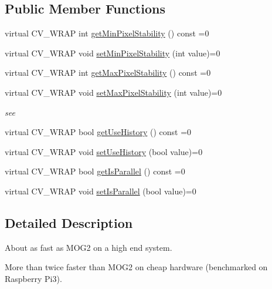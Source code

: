 \subsection*{Public Member Functions}
\begin{DoxyCompactItemize}
\item 
virtual C\+V\+\_\+\+W\+R\+AP int \hyperlink{classcv_1_1bgsubcnt_1_1BackgroundSubtractorCNT_ae989dd01f33c289a21b995ee9c69c600}{get\+Min\+Pixel\+Stability} () const =0
\item 
virtual C\+V\+\_\+\+W\+R\+AP void \hyperlink{classcv_1_1bgsubcnt_1_1BackgroundSubtractorCNT_a7fe9be675d4c1995123a60d56db75422}{set\+Min\+Pixel\+Stability} (int value)=0
\item 
virtual C\+V\+\_\+\+W\+R\+AP int \hyperlink{classcv_1_1bgsubcnt_1_1BackgroundSubtractorCNT_ac45a2faa6b753624cbbff9d341cdd3db}{get\+Max\+Pixel\+Stability} () const =0
\item 
virtual C\+V\+\_\+\+W\+R\+AP void \hyperlink{classcv_1_1bgsubcnt_1_1BackgroundSubtractorCNT_a3414551506bf27dda254dd245bfa8e03}{set\+Max\+Pixel\+Stability} (int value)=0
\begin{DoxyCompactList}\small\item\em see \end{DoxyCompactList}\item 
virtual C\+V\+\_\+\+W\+R\+AP bool \hyperlink{classcv_1_1bgsubcnt_1_1BackgroundSubtractorCNT_a86315a974023e507fdc7a40bba177399}{get\+Use\+History} () const =0
\item 
virtual C\+V\+\_\+\+W\+R\+AP void \hyperlink{classcv_1_1bgsubcnt_1_1BackgroundSubtractorCNT_ab2da57637e04beecbe8d812e00a54c52}{set\+Use\+History} (bool value)=0
\item 
virtual C\+V\+\_\+\+W\+R\+AP bool \hyperlink{classcv_1_1bgsubcnt_1_1BackgroundSubtractorCNT_a2e31e009b3901e4a1e43edf7e87cba51}{get\+Is\+Parallel} () const =0
\item 
virtual C\+V\+\_\+\+W\+R\+AP void \hyperlink{classcv_1_1bgsubcnt_1_1BackgroundSubtractorCNT_ab7d88f5d064b3c5cb0a18e80bd0bc265}{set\+Is\+Parallel} (bool value)=0
\end{DoxyCompactItemize}


\subsection{Detailed Description}
About as fast as M\+O\+G2 on a high end system.

More than twice faster than M\+O\+G2 on cheap hardware (benchmarked on Raspberry Pi3).

